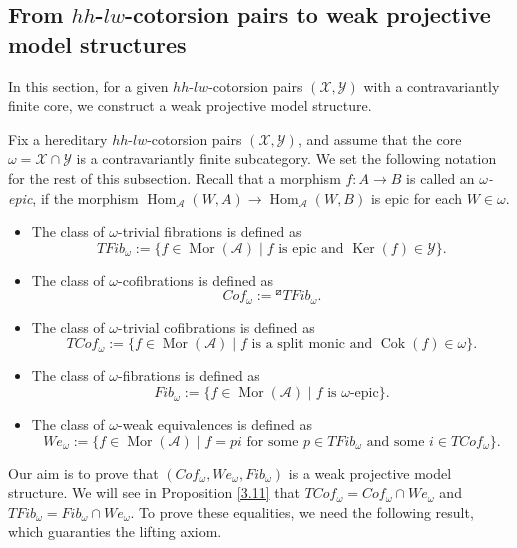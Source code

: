 \documentclass[12pt]{amsart}
\numberwithin{equation}{section}
\theoremstyle{definition}
\DeclareMathOperator{\Hom}{Hom}
\DeclareMathOperator{\Mor}{Mor}
\DeclareMathOperator{\Ker}{Ker}
\DeclareMathOperator{\Cok}{Cok}
\newtheorem*{theorem 0*}{Theorem}
\newtheorem*{theorem a*}{Theorem A}
\newtheorem*{theorem b*}{Theorem B}
\numberwithin{diagram}{section}
\begin{document}
\subsection{From $hh$-$lw$-cotorsion pairs to weak projective model structures}
In this section, for a given $hh$-$lw$-cotorsion pairs $(\mathcal{X},\mathcal{Y})$ with a contravariantly finite core, we construct a weak projective model structure.

Fix a hereditary $hh$-$lw$-cotorsion pairs $(\mathcal{X},\mathcal{Y})$, and assume that the core $\omega=\mathcal{X}\cap\mathcal{Y}$ is a contravariantly finite subcategory. We set the following notation for the rest of this subsection. Recall that a morphism $f:A\rightarrow B$ is called an {\it $\omega$-epic}, if the morphism $\Hom_{\mathcal{A}}(W,A)\rightarrow \Hom_{\mathcal{A}}(W,B)$ is epic for each $W\in\omega$.
\begin{itemize}
\item[(1)]
The class of $\omega$-trivial fibrations is defined as
\[TFib_{\omega}:=\{f\in \Mor(\mathcal{A})\mid f\text{ is epic and }\Ker(f)\in\mathcal{Y}\}.\]
\item[(2)]
The class of $\omega$-cofibrations is defined as
\[Cof_{\omega}:={}^{\boxslash}TFib_{\omega}.\]
\item[(3)]
The class of $\omega$-trivial cofibrations is defined as
\[TCof_{\omega}:=\{f\in \Mor(\mathcal{A})\mid f\text{ is a split monic and }\Cok(f)\in\omega\}.\]
\item[(4)]
The class of $\omega$-fibrations is defined as
\[Fib_{\omega}:=\{f\in \Mor(\mathcal{A})\mid f \text{ is } \omega\text{-epic}\}.\]
\item[(5)]
The class of $\omega$-weak equivalences is defined as
\[We_{\omega}:=\{f\in \Mor(\mathcal{A})\mid f=pi\text{ for some }p\in TFib_{\omega} \text{ and some } i\in TCof_{\omega}\}.\]
\end{itemize}

Our aim is to prove that $(Cof_{\omega},We_{\omega},Fib_{\omega})$ is a weak projective model structure.
We will see in Proposition \ref{3.11} that $TCof_{\omega}=Cof_{\omega}\cap We_{\omega}$ and $TFib_{\omega}=Fib_{\omega}\cap We_{\omega}$. To prove these equalities, we need the following result, which guaranties the lifting axiom.
\end{document}
